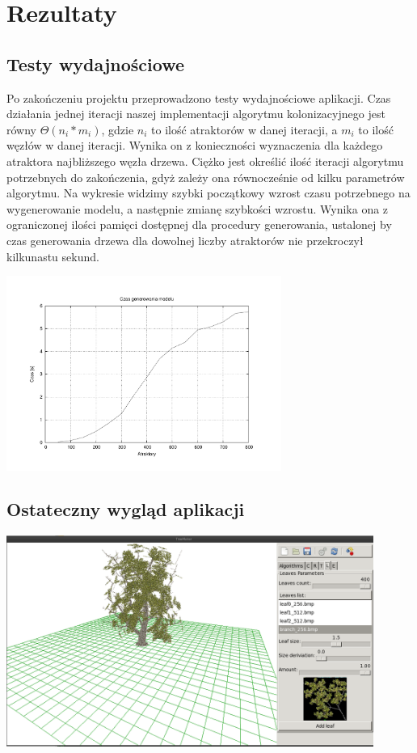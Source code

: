
\chapter{Rezultaty}


\section{Testy wydajnościowe}
Po zakończeniu projektu przeprowadzono testy wydajnościowe aplikacji. Czas działania jednej iteracji naszej implementacji algorytmu kolonizacyjnego jest równy ${\Theta(n_i*m_i)}$, gdzie ${n_i}$ to ilość atraktorów
w danej iteracji, a ${m_i}$ to ilość węzłów w danej iteracji. Wynika on z konieczności wyznaczenia dla każdego atraktora najbliższego węzła drzewa.
Ciężko jest określić ilość iteracji algorytmu potrzebnych do zakończenia, gdyż zależy ona równocześnie od kilku parametrów algorytmu.
 Na wykresie widzimy
szybki początkowy wzrost czasu potrzebnego na wygenerowanie modelu, a następnie zmianę szybkości wzrostu. Wynika ona z ograniczonej ilości
pamięci dostępnej dla procedury generowania, ustalonej by czas generowania drzewa dla dowolnej liczby atraktorów nie przekroczył kilkunastu sekund.



\begin{center}
	\includegraphics[width=90mm]{images/performance.pdf}
\end{center}

\section{Ostateczny wygląd aplikacji}
\begin{center}
	\includegraphics[width=120mm]{images/gui/all.png}
\end{center}

